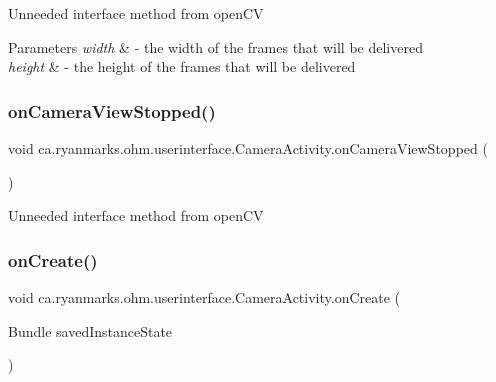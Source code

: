 Unneeded interface method from open\+CV 
\begin{DoxyParams}{Parameters}
{\em width} & -\/ the width of the frames that will be delivered \\
\hline
{\em height} & -\/ the height of the frames that will be delivered \\
\hline
\end{DoxyParams}
\hypertarget{classca_1_1ryanmarks_1_1ohm_1_1userinterface_1_1_camera_activity_a33cb29ef55f85b3459231b01d15db6c3}{}\label{classca_1_1ryanmarks_1_1ohm_1_1userinterface_1_1_camera_activity_a33cb29ef55f85b3459231b01d15db6c3} 
\subsubsection{\texorpdfstring{on\+Camera\+View\+Stopped()}{onCameraViewStopped()}}
{\footnotesize\ttfamily void ca.\+ryanmarks.\+ohm.\+userinterface.\+Camera\+Activity.\+on\+Camera\+View\+Stopped (\begin{DoxyParamCaption}{ }\end{DoxyParamCaption})}

Unneeded interface method from open\+CV \hypertarget{classca_1_1ryanmarks_1_1ohm_1_1userinterface_1_1_camera_activity_afa73d36e5322e895558c6663acb190bf}{}\label{classca_1_1ryanmarks_1_1ohm_1_1userinterface_1_1_camera_activity_afa73d36e5322e895558c6663acb190bf} 
\subsubsection{\texorpdfstring{on\+Create()}{onCreate()}}
{\footnotesize\ttfamily void ca.\+ryanmarks.\+ohm.\+userinterface.\+Camera\+Activity.\+on\+Create (\begin{DoxyParamCaption}\item[{Bundle}]{saved\+Instance\+State }\end{DoxyParamCaption})}

